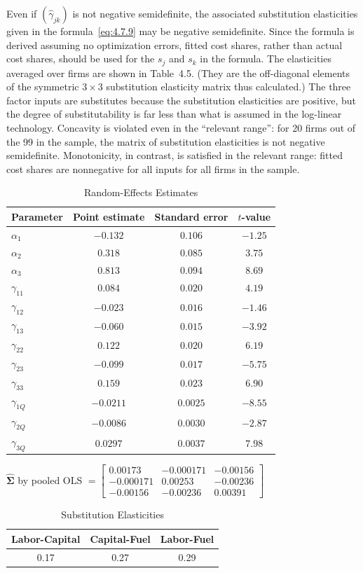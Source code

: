 Even if $(\hat{\gamma}_{jk})$ is not negative semidefinite, the associated substitution
elasticities given in the formula~\eqref{eq:4.7.9} may be negative semidefinite.
Since the formula is derived assuming no optimization errors, fitted cost shares,
rather than actual cost shares, should be used for the $s_j$ and $s_k$ in the formula.
The elasticities averaged over firms are shown in Table~4.5. (They are the
off-diagonal elements of the symmetric $3 \times 3$ substitution elasticity matrix
thus calculated.) The three factor inputs are substitutes because the substitution
elasticities are positive, but the degree of substitutability is far less than what is
assumed in the log-linear technology. Concavity is violated even in the ``relevant
range'': for 20 firms out of the 99 in the sample, the matrix of substitution
elasticities is not negative semidefinite. Monotonicity, in contrast, is satisfied in the
relevant range: fitted cost shares are nonnegative for all inputs for all firms in the sample.

\begin{table}[htbp]
\centering
\caption{Random-Effects Estimates}
\label{tab:4.4}
\medskip
\begin{tabular}{@{}lccc@{}}
\toprule
Parameter & Point estimate & Standard error & $t$-value \\
\midrule
$\alpha_1$ & $-0.132$ & $0.106$ & $-1.25$ \\
$\alpha_2$ & $0.318$ & $0.085$ & $3.75$ \\
$\alpha_3$ & $0.813$ & $0.094$ & $8.69$ \\
$\gamma_{11}$ & $0.084$ & $0.020$ & $4.19$ \\
$\gamma_{12}$ & $-0.023$ & $0.016$ & $-1.46$ \\
$\gamma_{13}$ & $-0.060$ & $0.015$ & $-3.92$ \\
$\gamma_{22}$ & $0.122$ & $0.020$ & $6.19$ \\
$\gamma_{23}$ & $-0.099$ & $0.017$ & $-5.75$ \\
$\gamma_{33}$ & $0.159$ & $0.023$ & $6.90$ \\
$\gamma_{1Q}$ & $-0.0211$ & $0.0025$ & $-8.55$ \\
$\gamma_{2Q}$ & $-0.0086$ & $0.0030$ & $-2.87$ \\
$\gamma_{3Q}$ & $0.0297$ & $0.0037$ & $7.98$ \\
\bottomrule
\end{tabular}
\bigskip

$\widehat{\boldsymbol{\Sigma}}$ by pooled OLS $= \begin{bmatrix}
0.00173 & -0.000171 & -0.00156 \\
-0.000171 & 0.00253 & -0.00236 \\
-0.00156 & -0.00236 & 0.00391
\end{bmatrix}$
\end{table}

\begin{table}[htbp]
\centering
\caption{Substitution Elasticities}
\label{tab:4.5}
\medskip
\begin{tabular}{@{}ccc@{}}
\toprule
Labor-Capital & Capital-Fuel & Labor-Fuel \\
\midrule
0.17 & 0.27 & 0.29 \\
\bottomrule
\end{tabular}
\end{table}
